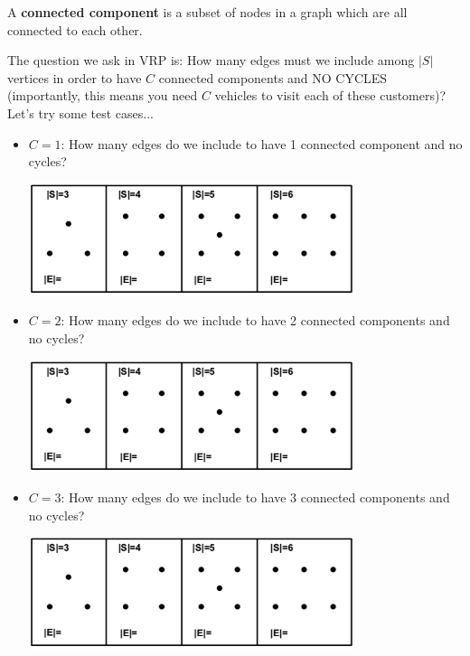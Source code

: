 \documentclass[11pt]{article}
\theoremstyle{definition}
\begin{document}
\begin{tcolorbox}
A \textbf{connected component} is a subset of nodes in a graph which are all connected to each other.
\end{tcolorbox}

The question we ask in VRP is: How many edges must we include among $|S|$ vertices in order to have $C$ connected components and NO CYCLES (importantly, this means you need $C$ vehicles to visit each of these customers)?  Let's try some test cases...

\begin{itemize}
\item $C = 1$: How many edges do we include to have 1 connected component and no cycles?
\begin{center}
\includegraphics[width=0.75\textwidth]{four_graphs.png}
\end{center}
\item $C = 2$: How many edges do we include to have 2 connected components and no cycles?
\begin{center}
\includegraphics[width=0.75\textwidth]{four_graphs.png}
\end{center}
\item $C = 3$: How many edges do we include to have 3 connected components and no cycles?
\begin{center}
\includegraphics[width=0.75\textwidth]{four_graphs.png}
\end{center}
\end{itemize}
\end{document}
